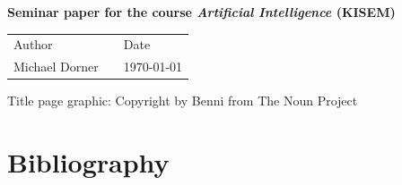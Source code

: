 \begin{titlepage}
\begin{center}
    \vspace{5em}

    {\sffamily \large \bfseries  Seminar paper for the course \textit{Artificial Intelligence} (KISEM)}\\[3em]


    {  \normalsize 
        \begin{tabular}{p{3cm} p{1cm} p{3cm}}
        {\small \sffamily Author} & & {\small \sffamily Date} \\[0.5em]
        Michael Dorner & & \today
        \end{tabular}

    
    
%           
    } 
\end{center}

\end{titlepage}


\newpage

\renewcommand{\contentsname}{Table of Content}
\tableofcontents
\vfill
\begin{center}
\small{Title page graphic: Copyright by Benni from The Noun Project}
\end{center}


\newpage








\setcounter{section}{0}
\renewcommand{\thesection}{\Alph{section}}



\newpage

\section{Bibliography}
\printbibliography[heading=none]






